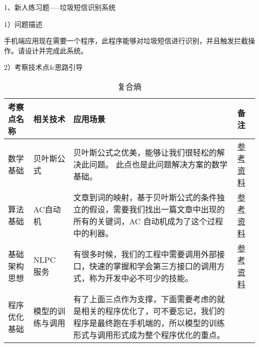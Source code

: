 \documentclass[10pt,a4paper]{ctexbook}
\begin{document}
1、新人练习题-----垃圾短信识别系统

1）问题描述

手机端应用现在需要一个程序，此程序能够对垃圾短信进行识别，并且触发拦截操作。请设计并完成此系统。

2）考察技术点\&思路引导
\begin{table}[H]
\centering
\begin{tabular}{|l|l|l|l|}
\hline
考察点名称 &
相关技术 &
应用场景 &
备注\\
\hline
数学基础 &
贝叶斯公式 &
贝叶斯公式之优美，能够让我们很轻松的解决此问题。
此点也是此问题解决方案的数学基础。 &
\href{http://www.cnblogs.com/leoo2sk/archive/2010/09/17/naive-bayesian-classifier.html}{参考资料} \\
\hline
算法基础 &
AC自动机 &
文章到词的映射，基于贝叶斯公式的条件独立的假设，需要我们找出一篇文章中出现的所有的关键词，AC 自动机成为了这个过程中的利器。&
\href{http://blog.csdn.net/niushuai666/article/details/7002823}{参考资料} \\
\hline
基础架构思想 &
NLPC 服务 &
有很多时候，我们的工程中需要调用外部接口，快速的掌握和学会第三方接口的调用方式，称为开发中必不可少的技能。&
\href{http://nlp.baidu.com/platform/?r=nlp/api}{参考资料} \\
\hline
程序优化基础 &
模型的训练与调用 &
有了上面三点作为支撑，下面需要考虑的就是相关的程序优化了，可不要忘记，我们的程序是最终跑在手机端的，所以模型的训练形式与调用形式成为整个程序优化的重点。& \\
\hline
\end{tabular}%
\caption{复合熵}
\label{tab:complex-entropy}
\end{table}



          
\ifx\mlbook\undefined
    
\end{document}
